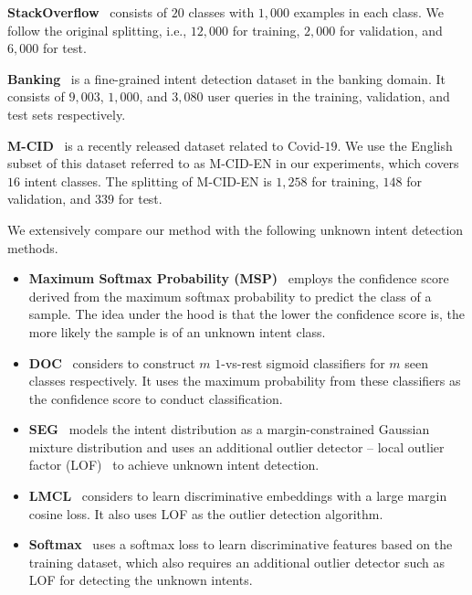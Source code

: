 \textbf{StackOverflow}~\citep{DBLP:conf/naacl/XuWTXZWH15} consists of $20$ classes with $1,000$ examples in each class. We follow the original splitting, i.e., $12,000$ for training, $2,000$ for validation, and $6,000$ for test.

\textbf{Banking}~\citep{DBLP:journals/corr/abs-2003-04807} is a fine-grained intent detection dataset in the banking domain. It consists of $9,003$, $1,000$, and $3,080$ user queries in the training, validation, and test sets respectively.

\textbf{M-CID}~\citep{arora2020cross} is a recently released dataset related to Covid-$19$. We use the English subset of this dataset referred to as M-CID-EN in our experiments, which covers $16$ intent classes. The splitting of M-CID-EN is $1,258$ for training, $148$ for validation, and $339$ for test. 

We extensively compare our method with the following unknown intent detection methods.
\begin{itemize}
\item \textbf{Maximum Softmax Probability (MSP)}~\citep{DBLP:conf/iclr/HendrycksG17} employs the confidence score derived from the maximum softmax probability to predict the class of a sample. The idea under the hood is that the lower the confidence score is, the more likely the sample is of an unknown intent class.

\item \textbf{DOC}~\citep{DBLP:conf/emnlp/ShuXL17} considers to construct $m$ $1$-vs-rest sigmoid classifiers for $m$ seen classes respectively. It uses the maximum probability from these classifiers as the confidence score to conduct classification.

\item \textbf{SEG}~\citep{DBLP:conf/acl/YanFLLZWL20} models the intent distribution as a margin-constrained Gaussian mixture distribution and uses an additional outlier detector -- local outlier factor (LOF)~\citep{10.1145/335191.335388} to achieve unknown intent detection. 

\item \textbf{LMCL}~\citep{DBLP:conf/acl/LinX19} considers to learn discriminative embeddings with a large margin cosine loss. It also uses LOF as the outlier detection algorithm.

\item \textbf{Softmax}~\citep{DBLP:conf/acl/YanFLLZWL20} uses a softmax loss to learn discriminative features based on the training dataset, which also requires an additional outlier detector such as LOF for detecting the unknown intents. 
\end{itemize}

